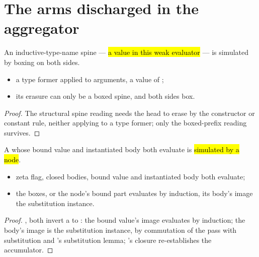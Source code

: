 \section{The arms discharged in the aggregator}
\label{sec:correctness:arms}

\begin{lemma}
\label{lem:indVal_arm}
\leanok
{}
 An inductive-type-name spine --- \hl{a value in this weak evaluator} --- is simulated by
boxing on both sides.
\begin{itemize}
\item {} a type former applied to arguments, a value of \SEval{};
\item {} its erasure can only be a boxed spine, and both sides box.
\end{itemize}
\end{lemma}
\begin{proof}
\leanok
{}
 The structural spine reading needs the head to erase by the constructor or constant rule,
neither applying to a type former; only the boxed-prefix reading survives.
\end{proof}

\begin{lemma}
\label{lem:zeta_arm}
\leanok
{}
 A  whose bound value and instantiated body both evaluate is \hl{simulated by a
 node}.
\begin{itemize}
\item {} zeta flag, closed bodies, bound value and instantiated body both evaluate;
\item {} the  boxes, or the  node's bound part evaluates by induction,
its body's image the substitution instance.
\end{itemize}
\end{lemma}
\begin{proof}
\leanok
{}
 \Erases{}, \Lower{} both invert a  to : the bound value's image
evaluates by induction; the body's image is the substitution instance, by commutation of the pass with
substitution and \Erases{}'s substitution lemma; \ErasesEnv{}'s closure re-establishes the accumulator.
\end{proof}

